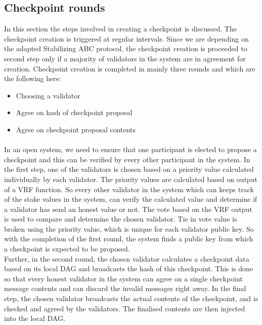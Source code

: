 \subsection{Checkpoint rounds}
In this section the steps involved in creating a checkpoint is discussed. The checkpoint creation is triggered at regular intervals. Since we are depending on the adapted Stabilizing ABC protocol, the checkpoint creation is proceeded to second step only if a majority of validators in the system are in agreement for creation. Checkpoint creation is completed in mainly three rounds and which are the following here:

\begin{itemize}
\item Choosing a validator
\item Agree on hash of checkpoint proposal
\item Agree on checkpoint proposal contents
\end{itemize}

\paragraph{}In an open system, we need to ensure that one participant is elected to propose a checkpoint and this can be verified by every other participant in the system. In the first step, one of the validators is chosen based on a priority value calculated individually by each validator. The priority values are calculated based on output of a VRF function. So every other validator in the system which can keeps track of the stake values in the system, can verify the calculated value and determine if a validator has send an honest value or not. The vote based on the VRF output is used to compare and determine the chosen validator. Tie in vote value is broken using the priority value, which is unique for each validator public key. So with the completion of the first round, the system finds a public key from which a checkpoint is expected to be proposed.\\
Further, in the second round, the chosen validator calculates a checkpoint data based on its local DAG and broadcasts the hash of this checkpoint. This is done so that every honest validator in the system can agree on a single checkpoint message contents and can discard the invalid messages right away. In the final step, the chosen validator broadcasts the actual contents of the checkpoint, and is checked and agreed by the validators. The finalised contents are then injected into the local DAG. 

